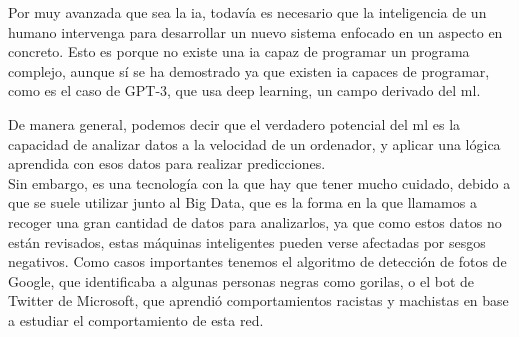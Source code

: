 Por muy avanzada que sea la \gls{ia}, todavía es necesario que la inteligencia de un humano intervenga para desarrollar un nuevo sistema enfocado en un aspecto en concreto. Esto es porque no existe una \gls{ia} capaz de programar un programa complejo, aunque sí se ha demostrado ya que existen \gls{ia} capaces de programar, como es el caso de GPT-3, que usa deep learning, un campo derivado del \gls{ml}.

De manera general, podemos decir que el verdadero potencial del \gls{ml} es la capacidad de analizar datos a la velocidad de un ordenador, y aplicar una lógica aprendida con esos datos para realizar predicciones.
\\
Sin embargo, es una tecnología con la que hay que tener mucho cuidado, debido a que se suele utilizar junto al Big Data, que es la forma en la que llamamos a recoger una gran cantidad de datos para analizarlos, ya que como estos datos no están revisados, estas máquinas inteligentes pueden verse afectadas por sesgos negativos. Como casos importantes tenemos el algoritmo de detección de fotos de Google, que identificaba a algunas personas negras como gorilas, o el bot de Twitter de Microsoft, que aprendió comportamientos racistas y machistas en base a estudiar el comportamiento de esta red. 

